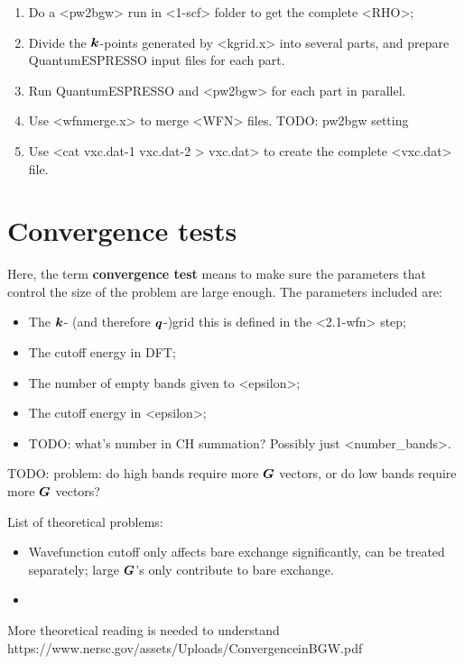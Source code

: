 \documentclass[hyperref, a4paper, 12pt]{report}
\newcommand*{\concept}[1]{{\textbf{#1}}}
\def\texttt#1{<#1>}%
\newcommand{\shortcode}[1]{\texttt{#1}}
\begin{document}
\begin{enumerate}
    \item Do a \shortcode{pw2bgw} run in \shortcode{1-scf} folder to get the complete \shortcode{RHO};
    \item Divide the $\vb*{k}$-points generated by \shortcode{kgrid.x} 
    into several parts,
    and prepare QuantumESPRESSO input files for each part.
    \item Run QuantumESPRESSO and \shortcode{pw2bgw} for each part in parallel.
    \item Use \shortcode{wfnmerge.x} to merge \shortcode{WFN} files. TODO: pw2bgw setting
    \item Use \shortcode{cat vxc.dat-1 vxc.dat-2 > vxc.dat} to create the complete \shortcode{vxc.dat} file.
\end{enumerate}

\section{Convergence tests}

Here, the term \concept{convergence test} means 
to make sure the parameters that control the size of the problem 
are large enough. 
The parameters included are: 
\begin{itemize}
    \item The $\vb*{k}$- (and therefore $\vb*{q}$-)grid
        this is defined in the \shortcode{2.1-wfn} step;
    \item The cutoff energy in DFT; 
    \item The number of empty bands given to \shortcode{epsilon}; 
    \item The cutoff energy in \shortcode{epsilon}; 
    \item TODO: what's number in CH summation? Possibly just \shortcode{number_bands}.
\end{itemize}

TODO: problem: do high bands require more $\vb*{G}$ vectors, 
or do low bands require more $\vb*{G}$ vectors?

List of theoretical problems: 
\begin{itemize}
    \item Wavefunction cutoff only affects bare exchange 
    significantly, can be treated separately; 
    large $\vb*{G}$'s only contribute to bare exchange. 
    \item 
\end{itemize}

More theoretical reading is needed to understand
https://www.nersc.gov/assets/Uploads/ConvergenceinBGW.pdf
\end{document}
